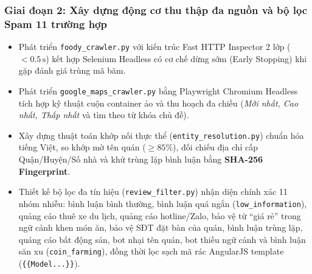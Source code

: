 \documentclass[12pt, a4paper]{article}
\begin{document}
\subsubsection{Giai đoạn 2: Xây dựng động cơ thu thập đa nguồn và bộ lọc Spam 11 trường hợp}
\begin{itemize}[leftmargin=1.2cm]
    \item Phát triển \texttt{foody\_crawler.py} với kiến trúc Fast HTTP Inspector 2 lớp ($<0.5\,\mathrm{s}$) kết hợp Selenium Headless có cơ chế dừng sớm (Early Stopping) khi gặp đánh giá trùng mã băm.
    \item Phát triển \texttt{google\_maps\_crawler.py} bằng Playwright Chromium Headless tích hợp kỹ thuật cuộn container ảo và thu hoạch đa chiều (\textit{Mới nhất, Cao nhất, Thấp nhất} và tìm theo từ khóa chủ đề).
    \item Xây dựng thuật toán khớp nối thực thể (\texttt{entity\_resolution.py}) chuẩn hóa tiếng Việt, so khớp mờ tên quán ($\ge 85\%$), đối chiếu địa chỉ cấp Quận/Huyện/Số nhà và khử trùng lặp bình luận bằng \textbf{SHA-256 Fingerprint}.
    \item Thiết kế bộ lọc đa tín hiệu (\texttt{review\_filter.py}) nhận diện chính xác 11 nhóm nhiễu: bình luận bình thường, bình luận quá ngắn (\texttt{low\_information}), quảng cáo thuê xe du lịch, quảng cáo hotline/Zalo, bảo vệ từ ``giá rẻ'' trong ngữ cảnh khen món ăn, bảo vệ SĐT đặt bàn của quán, bình luận trùng lặp, quảng cáo bất động sản, bot nhại tên quán, bot thiếu ngữ cảnh và bình luận săn xu (\texttt{coin\_farming}), đồng thời lọc sạch mã rác AngularJS template (\texttt{\{\{Model...\}\}}).
\end{itemize}
\end{document}
